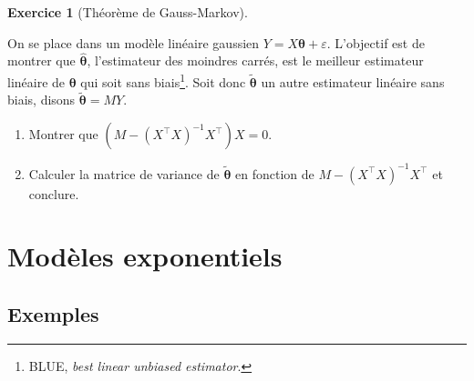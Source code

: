 \documentclass[
  10,
  letterpaper,
  DIV=11,
  numbers=noendperiod]{scrreport}
\providecommand{\tightlist}{%
  \setlength{\itemsep}{0pt}\setlength{\parskip}{0pt}}\usepackage{longtable,booktabs,array}
\newcommand{\bt}{\boldsymbol{\theta}}
\theoremstyle{plain}
\theoremstyle{definition}
\newtheorem{exercise}{Exercice}[chapter]
\theoremstyle{plain}
\theoremstyle{definition}
\theoremstyle{definition}
\theoremstyle{plain}
\theoremstyle{remark}
\begin{document}
\begin{exercise}[Théorème de
Gauss-Markov]\protect\hypertarget{exr-gaussmarkov}{}\label{exr-gaussmarkov}

On se place dans un modèle linéaire gaussien \(Y = X\bt + \varepsilon\).
L'objectif est de montrer que \(\hat{\bt}\), l'estimateur des moindres
carrés, est le meilleur estimateur linéaire de \(\bt\) qui soit sans
biais\footnote{BLUE, \emph{best linear unbiased estimator}.}. Soit donc
\(\tilde{\bt}\) un autre estimateur linéaire sans biais, disons
\(\tilde{\bt} = MY\).

\begin{enumerate}
\def\labelenumi{\arabic{enumi}.}
\tightlist
\item
  Montrer que \((M - (X^\top X)^{-1}X^\top)X= 0\).
\item
  Calculer la matrice de variance de \(\tilde{\bt}\) en fonction de
  \(M - (X^\top X)^{-1}X^\top\) et conclure.
\end{enumerate}

\end{exercise}


\hypertarget{moduxe8les-exponentiels}{%
\chapter{Modèles exponentiels}\label{moduxe8les-exponentiels}}

\hypertarget{exemples}{%
\section*{Exemples}\label{exemples}}

\end{document}
